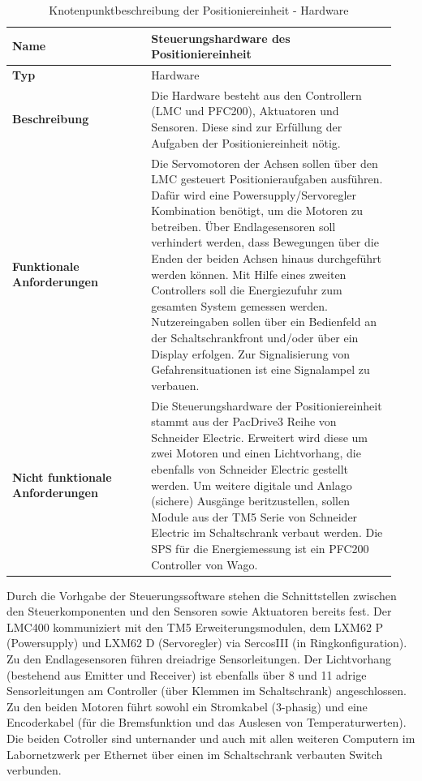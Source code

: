 \documentclass[../../../Bachelorarbeit.tex]{subfiles}
\begin{document}
\begin{table}[H]
    \centering
    \begin{tabular}{| p{0.34\linewidth} | p{0.6\linewidth} |}
        \hline
        \textbf{Name} & Steuerungshardware des Positioniereinheit \\ \hline
        \textbf{Typ} & Hardware \\ \hline
        \textbf{Beschreibung} & Die Hardware besteht aus den Controllern (LMC und PFC200), Aktuatoren und Sensoren. Diese sind zur Erfüllung der Aufgaben der Positioniereinheit nötig. \\ \hline
        \textbf{Funktionale Anforderungen} & Die Servomotoren der Achsen sollen über den LMC gesteuert Positionieraufgaben ausführen. Dafür wird eine Powersupply/Servoregler Kombination benötigt, um die Motoren zu betreiben. Über Endlagesensoren soll verhindert werden, dass Bewegungen über die Enden der beiden Achsen hinaus durchgeführt werden können. Mit Hilfe eines zweiten Controllers soll die Energiezufuhr zum gesamten System gemessen werden. Nutzereingaben sollen über ein Bedienfeld an der Schaltschrankfront und/oder über ein Display erfolgen. Zur Signalisierung von Gefahrensituationen ist eine Signalampel zu verbauen. \\ \hline
        \textbf{Nicht funktionale Anforderungen} & Die Steuerungshardware der Positioniereinheit stammt aus der PacDrive3 Reihe von Schneider Electric. Erweitert wird diese um zwei Motoren und einen Lichtvorhang, die ebenfalls von Schneider Electric gestellt werden. Um weitere digitale und Anlago (sichere) Ausgänge beritzustellen, sollen Module aus der TM5 Serie von Schneider Electric im Schaltschrank verbaut werden. Die SPS für die Energiemessung ist ein PFC200 Controller von Wago. \\ \hline
    \end{tabular}
    \caption[Knotenpunktbeschreibung - Hardware]{Knotenpunktbeschreibung der Positioniereinheit - Hardware}
    \label{tab:my-table51}
\end{table}

Durch die Vorhgabe der Steuerungssoftware stehen die Schnittstellen zwischen den Steuerkomponenten und den Sensoren sowie Aktuatoren bereits fest. Der LMC400 kommuniziert mit den TM5 Erweiterungsmodulen, dem LXM62 P (Powersupply) und LXM62 D (Servoregler) via SercosIII (in Ringkonfiguration). Zu den Endlagesensoren führen dreiadrige Sensorleitungen. Der Lichtvorhang (bestehend aus Emitter und Receiver) ist ebenfalls über 8 und 11 adrige Sensorleitungen am Controller (über Klemmen im Schaltschrank) angeschlossen. Zu den beiden Motoren führt sowohl ein Stromkabel (3-phasig) und eine Encoderkabel (für die Bremsfunktion und das Auslesen von \zB Temperaturwerten). Die beiden Cotroller sind unternander und auch mit allen weiteren Computern im Labornetzwerk per Ethernet über einen im Schaltschrank verbauten Switch verbunden.
\end{document}
